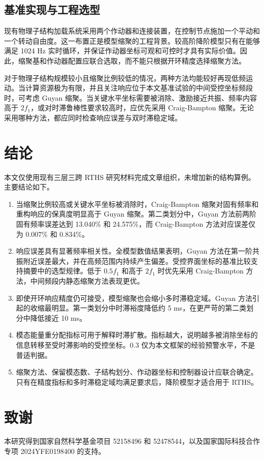 \documentclass[UTF8,11pt,a4paper]{ctexart}
\begin{document}
\subsection{基准实现与工程选型}

现有物理子结构加载系统采用两个作动器和连接装置，在控制节点施加一个平动和一个转动自由度。这一布置正是模型缩聚的工程背景。较高阶降阶模型只有在能够满足 1024 Hz 实时循环，并保证作动器坐标可观和可控时才具有实际价值。因此，缩聚基和作动器配置应联合选取，而不能只根据开环精度选择缩聚方法。

对于物理子结构规模较小且缩聚比例较低的情况，两种方法均能较好再现低频运动。当计算资源极为有限，并且关注响应位于本文基准试验的中间受控坐标频段时，可考虑 Guyan 缩聚。当关键水平坐标需要被消除、激励接近共振、频率内容高于 $2f_1$，或对时滞鲁棒性要求较高时，应优先采用 Craig-Bampton 缩聚。无论采用哪种方法，都应同时检查响应误差与双时滞稳定域。

\section{结论}

本文仅使用现有三层三跨 RTHS 研究材料完成文章组织，未增加新的结构算例。主要结论如下。

\begin{enumerate}[leftmargin=2.2em]
\item 当缩聚比例较高或关键水平坐标被消除时，Craig-Bampton 缩聚对固有频率和重构响应的保真度明显高于 Guyan 缩聚。第二类划分中，Guyan 方法前两阶固有频率误差达到 13.040\% 和 24.575\%，而 Craig-Bampton 方法对应误差仅为 0.007\% 和 0.834\%。
\item 响应误差具有显著频率相关性。全模型数值结果表明，Guyan 方法在第一阶共振附近误差最大，并在高频范围内持续产生偏差。受控界面坐标的基准比较支持摘要中的选型规律。低于 $0.5f_1$ 和高于 $2f_1$ 时优先采用 Craig-Bampton 方法，中间频段内静态缩聚方法表现更优。
\item 即使开环响应精度仍可接受，模型缩聚也会缩小多时滞稳定域。Guyan 方法引起的收缩最明显。第一类划分中时滞裕度降低约 5 ms，在更严苛的第二类划分中降低接近 10 ms。
\item 模态能量重分配指标可用于解释时滞扩散。指标越大，说明越多被消除坐标的信息转移至受时滞影响的受控坐标。0.3 仅为本文框架的经验预警水平，不是普适判据。
\item 缩聚方法、保留模态数、子结构划分、作动器坐标和控制器设计应联合确定。只有在精度指标和多时滞稳定域均满足要求后，降阶模型才适合用于 RTHS。
\end{enumerate}

\section*{致谢}
本研究得到国家自然科学基金项目 52158496 和 52478544，以及国家国际科技合作专项 2024YFE0198400 的支持。
\end{document}
